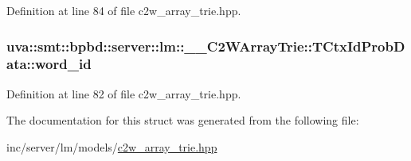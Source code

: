 Definition at line 84 of file c2w\+\_\+array\+\_\+trie.\+hpp.

\hypertarget{structuva_1_1smt_1_1bpbd_1_1server_1_1lm_1_1_____c2_w_array_trie_1_1_t_ctx_id_prob_data_a70f8afc11080e1f6c6c212ffcb94d14d}{}
\subsubsection[{word\+\_\+id}]{ uva\+::smt\+::bpbd\+::server\+::lm\+::\+\_\+\+\_\+\+C2\+W\+Array\+Trie\+::\+T\+Ctx\+Id\+Prob\+Data\+::word\+\_\+id}\label{structuva_1_1smt_1_1bpbd_1_1server_1_1lm_1_1_____c2_w_array_trie_1_1_t_ctx_id_prob_data_a70f8afc11080e1f6c6c212ffcb94d14d}


Definition at line 82 of file c2w\+\_\+array\+\_\+trie.\+hpp.



The documentation for this struct was generated from the following file\+:\begin{DoxyCompactItemize}
\item 
inc/server/lm/models/\hyperlink{c2w__array__trie_8hpp}{c2w\+\_\+array\+\_\+trie.\+hpp}\end{DoxyCompactItemize}
